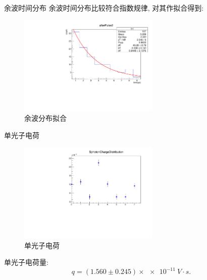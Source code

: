 \documentclass[10pt]{beamer}
\begin{document}
\begin{frame}[label={sec:org8d0e738}]{余波时间分布}
余波时间分布比较符合指数规律, 对其作拟合得到:

\begin{figure}[htbp]
\centering
\includegraphics[width=0.6\textwidth]{../../DetectorPerform/afterPulse/fig/afterPulse02r.pdf}
\caption{余波分布拟合}
\end{figure}
\end{frame}

\begin{frame}[label={sec:orgb7cd91f}]{单光子电荷}
\begin{figure}[htbp]
\centering
\includegraphics[width=0.6\textwidth]{../../DetectorPerform/SPhoton/SphotonCharge.pdf}
\caption{单光子电荷}
\end{figure}

单光子电荷量:
\begin{equation}
\label{eq:6}
q = (1.560 \pm 0.245)\times\qty{e-11}{V\cdot s}.
\end{equation}
\end{frame}
\end{document}
